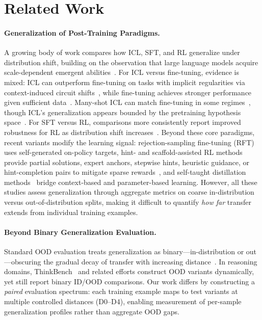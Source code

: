 \documentclass[]{bytedance_seed}
\theoremstyle{plain}
\theoremstyle{definition}
\theoremstyle{remark}
\begin{document}
\section{Related Work}

\paragraph{Generalization of Post-Training Paradigms.}
A growing body of work compares how ICL, SFT, and RL generalize under distribution shift, building on the observation that large language models acquire scale-dependent emergent abilities~\citep{wei2022emergent}. For ICL versus fine-tuning, evidence is mixed: ICL can outperform fine-tuning on tasks with implicit regularities via context-induced circuit shifts~\citep{yin2024deeper}, while fine-tuning achieves stronger performance given sufficient data~\citep{liu2022fewshot}. Many-shot ICL can match fine-tuning in some regimes~\citep{agarwal2024manyshot}, though ICL's generalization appears bounded by the pretraining hypothesis space~\citep{wang2024icl_ood, goddard2025icl_ood}. For SFT versus RL, comparisons more consistently report improved robustness for RL as distribution shift increases~\citep{kirk2024rlhf, chu2025sft, huan2025transferability, luong2024reft}. Beyond these core paradigms, recent variants modify the learning signal: rejection-sampling fine-tuning (RFT)~\citep{yuan2023rft} uses self-generated on-policy targets, hint- and scaffold-assisted RL methods provide partial solutions, expert anchors, stepwise hints, heuristic guidance, or hint-completion pairs to mitigate sparse rewards~\citep{li2026questa,ghpo2025,zhang2026bread,zhang2025stephint,wang2026hint,huang2025hintgrpo,kang2025table}, and self-taught distillation methods~\citep{sdft2026, opsd2026} bridge context-based and parameter-based learning. However, all these studies assess generalization through aggregate metrics on coarse in-distribution versus out-of-distribution splits, making it difficult to quantify \emph{how far} transfer extends from individual training examples.

\paragraph{Beyond Binary Generalization Evaluation.}
Standard OOD evaluation treats generalization as binary---in-distribution or out---obscuring the gradual decay of transfer with increasing distance~\citep{ye2022oodbench, yu2024ood_survey}. In reasoning domains, ThinkBench~\citep{huang2025thinkbench} and related efforts construct OOD variants dynamically, yet still report binary ID/OOD comparisons. Our work differs by constructing a \emph{paired} evaluation spectrum: each training example maps to test variants at multiple controlled distances (D0--D4), enabling measurement of per-sample generalization profiles rather than aggregate OOD gaps.
\end{document}
